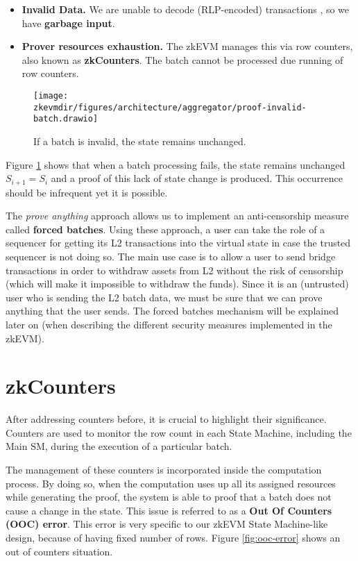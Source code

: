 \begin{itemize}
\item \textbf{Invalid Data.}
We are unable to decode (RLP-encoded) transactions , so we have \textbf{garbage input}.

\item \textbf{Prover resources exhaustion.}
The zkEVM manages this via row counters, also known as \textbf{zkCounters}. The batch cannot be processed due running of row counters.
\end{itemize}

\begin{figure}[H]
\centering
\texttt{[image: \\zkevmdir/figures/architecture/aggregator/proof-invalid-batch.drawio]}
\caption{If a batch is invalid, the state remains unchanged.}
\label{fig:invalid-batch}
\end{figure}

Figure \ref{fig:invalid-batch} shows that when a batch processing fails, the state remains unchanged $S_{i+1}=S_i$ and a proof of this lack of state change is produced. This occurrence should be infrequent yet it is possible.

The \textit{prove anything} approach allows us to implement an anti-censorship measure called \textbf{forced batches}. Using these approach, a user can take the role of a sequencer for getting its L2 transactions into the virtual state in case the trusted sequencer is not doing so. The main use case is to allow a user to send bridge transactions in order to withdraw assets from L2 without the risk of censorship (which will make it impossible to withdraw the funds). Since it is an (untrusted) user who is sending the L2 batch data, we must be sure that we can prove anything that the user sends. The forced batches mechanism will be explained later on (when describing the different security measures implemented in the zkEVM).



\section{zkCounters}

After addressing counters before, it is crucial to highlight their significance. Counters are used to monitor the row count in each State Machine, including the Main SM, during the execution of a particular batch.

The management of these counters is incorporated inside the computation process. By doing so, when the computation uses up all its assigned resources while generating the proof, the system is able to proof that a batch does not cause a change in the state. This issue is referred to as a \textbf{Out Of Counters (OOC) error}. This error is very specific to our zkEVM State Machine-like design, because of having fixed number of rows. Figure \ref{fig:ooc-error} shows an out of counters situation.

